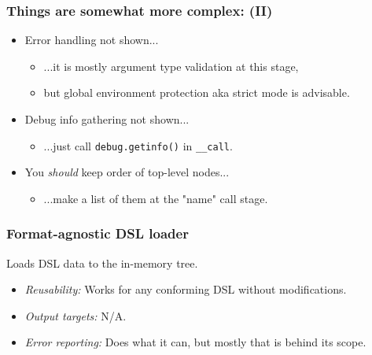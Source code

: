 \documentclass[handout]{beamer}
\begin{document}

\begin{frame}[fragile]

\frametitle{Things are somewhat more complex: (II)}

\begin{itemize}

\item Error handling not shown...
\pause
  \begin{itemize}
  \item ...it is mostly argument type validation at this stage,
  \item but global environment protection aka strict mode is advisable.
  \end{itemize}

\pause

\item Debug info gathering not shown...
\pause
  \begin{itemize}
  \item ...just call \verb|debug.getinfo()| in \verb|__call|.
  \end{itemize}

\pause

\item You \emph{should} keep order of top-level nodes...
\pause
  \begin{itemize}
  \item ...make a list of them at the "name" call stage.
  \end{itemize}

\end{itemize}

\end{frame}


\begin{frame}

\frametitle{Format-agnostic DSL loader}

Loads DSL data to the in-memory tree.

\begin{itemize}
\item \emph{Reusability:} Works for any conforming DSL without modifications.
\item \emph{Output targets:} N/A.
\item \emph{Error reporting:} Does what it can, but mostly that is behind its scope.
\end{itemize}

\end{frame}
\end{document}
